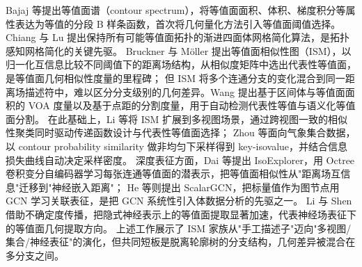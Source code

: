 \documentclass[twocolumn, a4paper, 10pt]{article}
\begin{document}
Bajaj 等提出等值面谱（contour spectrum），将等值面面积、体积、梯度积分等属性表达为等值的分段 B 样条函数，首次将几何量化方法引入等值面阈值选择。\cite{bajaj_spectrum_1997} Chiang 与 Lu 提出保持所有可能等值面拓扑的渐进四面体网格简化算法，是拓扑感知网格简化的关键先驱。\cite{chiang_lu_2003} Bruckner 与 Möller 提出等值面相似性图（ISM），以归一化互信息比较不同阈值下的距离场结构，从相似度矩阵中选出代表性等值面，是等值面几何相似性度量的里程碑；\cite{bruckner_ism_2010} 但 ISM 将多个连通分支的变化混合到同一距离场描述符中，难以区分分支级别的几何差异。Wang 提出基于区间体与等值面面积的 VOA 度量以及基于点距的分割度量，用于自动检测代表性等值与语义化等值面分割。\cite{wang_isomeasure_2020} 在此基础上，Li 等将 ISM 扩展到多视图场景，通过跨视图一致的相似性聚类同时驱动传递函数设计与代表性等值面选择；\cite{li_multiview_ism_2025} Zhou 等面向气象集合数据，以 contour probability similarity 做非均匀下采样得到 key-isovalue，并结合信息损失曲线自动决定采样密度。\cite{zhou_keyisovalue_2025} 深度表征方面，Dai 等提出 IsoExplorer，用 Octree 卷积变分自编码器学习每张连通等值面的潜表示，把等值面相似性从"距离场互信息"迁移到"神经嵌入距离"；\cite{dai_isoexplorer_2021} He 等则提出 ScalarGCN，把标量值作为图节点用 GCN 学习关联表征，是把 GCN 系统性引入体数据分析的先驱之一。\cite{he_scalargcn_2021} Li 与 Shen 借助不确定度传播，把隐式神经表示上的等值面提取显著加速，代表神经场表征下的等值面几何提取方向。\cite{li_shen_inr_2024} 上述工作展示了 ISM 家族从"手工描述子"迈向"多视图/集合/神经表征"的演化，但共同短板是脱离轮廓树的分支结构，几何差异被混合在多分支之间。
\end{document}
